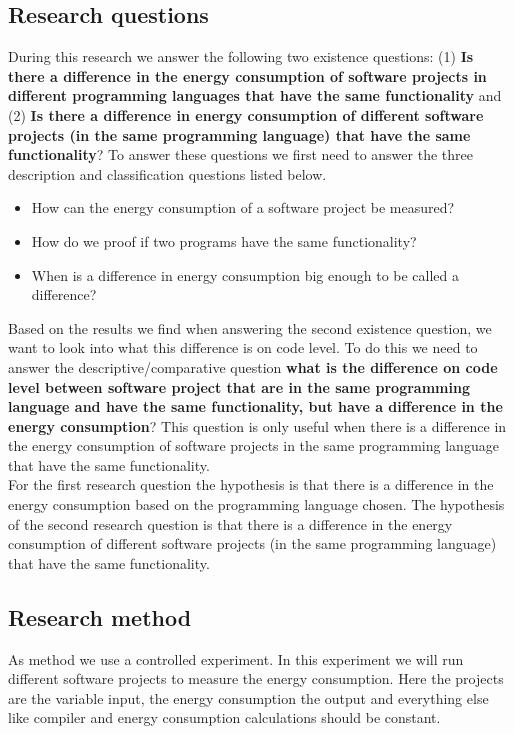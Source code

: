 \subsection{Research questions}
During this research we answer the following two existence questions: (1) \textbf{Is there a difference in the energy consumption of software projects in different programming languages that have the same functionality} and (2) \textbf{Is there a difference in energy consumption of different software projects (in the same programming language) that have the same functionality}? To answer these questions we first need to answer the three description and classification questions listed below.
\begin{itemize}
    \item How can the energy consumption of a software project be measured?
    \item How do we proof if two programs have the same functionality?
    \item When is a difference in energy consumption big enough to be called a difference?\\
\end{itemize}

Based on the results we find when answering the second existence question, we want to look into what this difference is on code level. To do this we need to answer the descriptive/comparative question \textbf{what is the difference on code level between software project that are in the same programming language and have the same functionality, but have a difference in the energy consumption}? This question is only useful when there is a difference in the energy consumption of software projects in the same programming language that have the same functionality. \\

For the first research question the hypothesis is that there is a difference in the energy consumption based on the programming language chosen. The hypothesis of the second research question is that there is a difference in the energy consumption of different software projects (in the same programming language) that have the same functionality.

\subsection{Research method}
As method we use a controlled experiment. In this experiment we will run different software projects to measure the energy consumption. Here the projects are the variable input, the energy consumption the output and everything else like compiler and energy consumption calculations should be constant.

